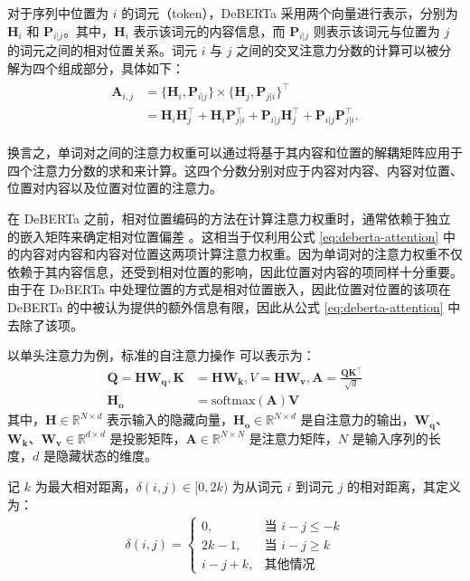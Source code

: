 对于序列中位置为 \(i\) 的词元（token），DeBERTa 采用两个向量进行表示，分别为 \(\mathbf{H}_{i}\) 和 \(\mathbf{P}_{i|j}\)。其中，\(\mathbf{H}_{i}\) 表示该词元的内容信息，而 \(\mathbf{P}_{i|j}\) 则表示该词元与位置为 \(j\) 的词元之间的相对位置关系。词元 \(i\) 与 \(j\) 之间的交叉注意力分数的计算可以被分解为四个组成部分，具体如下：
\begin{align}
\label{eq:deberta-attention}
\begin{split}
\mathbf{A}_{i, j} & = \{\mathbf{H}_{i}, \mathbf{P}_{i | j}\} \times \{\mathbf{H}_{j}, \mathbf{P}_{j | i}\}^{\intercal} \\
& = \mathbf{H}_{i}\mathbf{H}_{j}^{\intercal}+\mathbf{H}_{i}\mathbf{P}_{j | i}^{\intercal}+\mathbf{P}_{i | j}\mathbf{H}_{j}^{\intercal}+\mathbf{P}_{i | j}\mathbf{P}_{j | i}^{\intercal}.
\end{split}
\end{align}

换言之，单词对之间的注意力权重可以通过将基于其内容和位置的解耦矩阵应用于四个注意力分数的求和来计算。这四个分数分别对应于内容对内容、内容对位置、位置对内容以及位置对位置的注意力。

在 DeBERTa 之前，相对位置编码的方法在计算注意力权重时，通常依赖于独立的嵌入矩阵来确定相对位置偏差 \cite{Shaw2018SelfAttentionWR, Huang2018MusicTG}。这相当于仅利用公式 \ref{eq:deberta-attention} 中的内容对内容和内容对位置这两项计算注意力权重。因为单词对的注意力权重不仅依赖于其内容信息，还受到相对位置的影响，因此位置对内容的项同样十分重要。由于在 DeBERTa 中处理位置的方式是相对位置嵌入，因此位置对位置的该项在 DeBERTa 的中被认为提供的额外信息有限，因此从公式 \ref{eq:deberta-attention} 中去除了该项。

以单头注意力为例，标准的自注意力操作 \cite{transformer} 可以表示为：
\begin{align}
\mathbf{Q} = \mathbf{HW_{q}}, \mathbf{K} &= \mathbf{HW_{k}}, V = \mathbf{HW_{v}}, \mathbf{A} = \frac{\mathbf{QK}^{\intercal}}{\sqrt{d}} \\
\mathbf{H_{o}} &= \text{softmax}(\mathbf{A})\mathbf{V}
\label{eq:transformer-attention1}
\end{align}
其中，$\mathbf{H} \in \mathbb{R}^{N×d}$ 表示输入的隐藏向量，$\mathbf{H_{o}} \in \mathbb{R}^{N×d}$ 是自注意力的输出，$\mathbf{W_{q}}$、$\mathbf{W_{k}}$、$\mathbf{W_{v}} \in \mathbb{R}^{d×d}$ 是投影矩阵，$\mathbf{A} \in \mathbb{R}^{N×N}$ 是注意力矩阵，$N$ 是输入序列的长度，$d$ 是隐藏状态的维度。

记 $k$ 为最大相对距离，$\delta(i, j) \in [0, 2k)$ 为从词元 $i$ 到词元 $j$ 的相对距离，其定义为：
\begin{align}
\delta(i, j)=\begin{cases}
0, & \text{当~} i - j \leq -k \\
2k - 1, & \text{当~} i - j \geq k \\
i - j + k, & \text{其他情况}
\end{cases}
\label{eq:deberta-distance}
\end{align}


